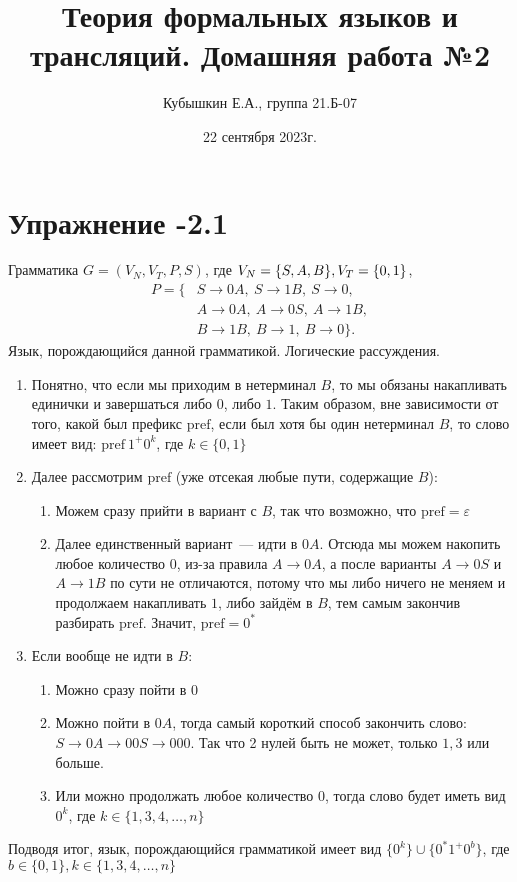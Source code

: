\documentclass[12pt, a4paper, oneside]{memoir}
\title{Теория формальных языков и трансляций. Домашняя работа №2}
\author{Кубышкин Е.А., группа 21.Б-07}
\date{22 сентября 2023г.}
\begin{document}
\maketitle

\section*{Упражнение -2.1}
\begin{solution}
    {Грамматика $G = (V_N, V_T, P, S)$, где $V_N = \{S, A, B\}, \\ V_T = \{0, 1\}$,
        \begin{align*}
            P = \{
             & S \to 0A, \   S \to 1B, \   S \to 0,    \\
             & A \to 0A,\    A \to 0S,\    A \to 1B,   \\
             & B\to 1B, \    B\to 1,   \    B\to 0 \}.
        \end{align*}
    }
    {Язык, порождающийся данной грамматикой.}
    {Логические рассуждения.}
    \begin{enumerate}
        \item Понятно, что если мы приходим в нетерминал $B$, то мы обязаны накапливать единички и завершаться либо $0$, либо $1$. Таким образом, вне зависимости от того, какой был префикс $\mathrm{pref}$, если был хотя бы один нетерминал $B$, то слово имеет вид: $\mathrm{pref}\ 1^+ 0^k$, где $k \in \{0, 1\}$
        \item Далее рассмотрим $\mathrm{pref}$ (уже отсекая любые пути, содержащие $B$):
              \begin{enumerate}
                  \item Можем сразу прийти в вариант с $B$, так что возможно, что $\mathrm{pref} = \varepsilon$
                  \item Далее единственный вариант~--- идти в $0A$. Отсюда мы можем накопить любое количество $0$, из-за правила $A\to 0A$, а после варианты $A \to 0S$ и $A\to 1B$ по сути не отличаются, потому что мы либо ничего не меняем и продолжаем накапливать $1$, либо зайдём в $B$, тем самым закончив разбирать $\mathrm{pref}$. Значит, $\mathrm{pref} = 0^*$
              \end{enumerate}
        \item Если вообще не идти в $B$:
              \begin{enumerate}
                  \item Можно сразу пойти в $0$
                  \item Можно пойти в $0A$, тогда самый короткий способ закончить слово: $S \to 0A \to 00S \to 000$. Так что 2 нулей быть не может, только $1, 3$ или больше.
                  \item Или можно продолжать любое количество $0$, тогда слово будет иметь вид $0^k$, где $k \in \{1, 3, 4,\dots ,n\}$
              \end{enumerate}
    \end{enumerate}
    Подводя итог, язык, порождающийся грамматикой имеет вид
    $\{0^k\} \cup \{0^*1^+0^b\}$, где $b \in \{0,1\}, k\in \{1,3,4, \dots , n\}$
\end{solution}
\end{document}
